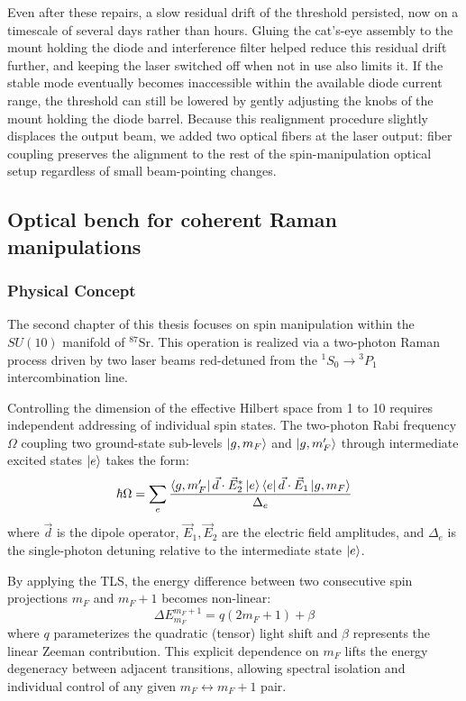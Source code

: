 Even after these repairs, a slow residual drift of the threshold persisted, now on a timescale of several days rather than hours. Gluing the cat's-eye assembly to the mount holding the diode and interference filter helped reduce this residual drift further, and keeping the laser switched off when not in use also limits it. If the stable mode eventually becomes inaccessible within the available diode current range, the threshold can still be lowered by gently adjusting the knobs of the mount holding the diode barrel. Because this realignment procedure slightly displaces the output beam, we added two optical fibers at the laser output: fiber coupling preserves the alignment to the rest of the spin-manipulation optical setup regardless of small beam-pointing changes.

\subsection{Optical bench for coherent Raman manipulations}

\subsubsection{Physical Concept}
The second chapter of this thesis focuses on spin manipulation within the $SU(10)$ manifold of $^{87}\text{Sr}$. This operation is realized via a two-photon Raman process driven by two laser beams red-detuned from the $^1S_0 \rightarrow {}^3P_1$ intercombination line.

Controlling the dimension of the effective Hilbert space from 1 to 10 requires independent addressing of individual spin states. The two-photon Rabi frequency $\Omega$ coupling two ground-state sub-levels $\ket{g, m_F}$ and $\ket{g, m_F'}$ through intermediate excited states $\ket{e}$ takes the form:
\begin{equation}
\hbar \Omega = \sum_{e} \frac{\bra{g, m_F'} \vec{d} \cdot \vec{E}_2^* \ket{e} \bra{e} \vec{d} \cdot \vec{E}_1 \ket{g, m_F}}{\Delta_e}
\end{equation}
where $\vec{d}$ is the dipole operator, $\vec{E}_1, \vec{E}_2$ are the electric field amplitudes, and $\Delta_e$ is the single-photon detuning relative to the intermediate state $\ket{e}$.

By applying the TLS, the energy difference between two consecutive spin projections $m_F$ and $m_F+1$ becomes non-linear:
\begin{equation}
\Delta E_{m_F}^{m_F+1} = q(2 m_F + 1) + \beta
\end{equation}
where $q$ parameterizes the quadratic (tensor) light shift and $\beta$ represents the linear Zeeman contribution. This explicit dependence on $m_F$ lifts the energy degeneracy between adjacent transitions, allowing spectral isolation and individual control of any given $m_F \leftrightarrow m_F+1$ pair.

